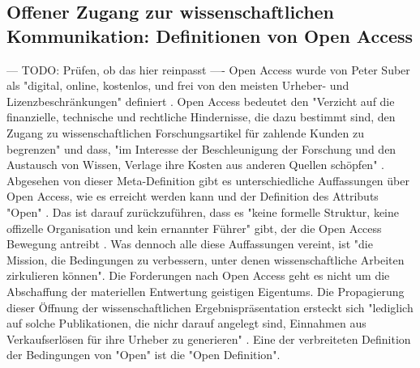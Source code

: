 \subsection{Offener Zugang zur wissenschaftlichen Kommunikation: Definitionen von Open Access}
--- TODO: Prüfen, ob das hier reinpasst ----
Open Access wurde von Peter Suber als "digital, online, kostenlos, und frei von den meisten Urheber- und Lizenzbeschränkungen" \cite{suber_2012_open} definiert \cite{Adema_2014_open_access}. Open Access bedeutet den "Verzicht auf die finanzielle, technische und rechtliche Hindernisse, die dazu bestimmt sind, den Zugang zu wissenschaftlichen Forschungsartikel für zahlende Kunden zu begrenzen" und dass, "im Interesse der Beschleunigung der Forschung und den Austausch von Wissen, Verlage ihre Kosten aus anderen Quellen schöpfen" \cite{Suber_2002}. Abgesehen von dieser Meta-Definition gibt es unterschiedliche Auffassungen über Open Access, wie es erreicht werden kann und der Definition des Attributs "Open" \cite{Adema_2014_open_access}. Das ist darauf zurückzuführen, dass es "keine formelle Struktur, keine offizelle Organisation und kein ernannter Führer" gibt, der die Open Access Bewegung antreibt \cite{poynder_2011_suber}. Was dennoch alle diese Auffassungen vereint, ist "die Mission, die Bedingungen zu verbessern, unter denen wissenschaftliche Arbeiten zirkulieren können"\cite{Adema_2014_open_access}. Die Forderungen nach Open Access geht es nicht um die Abschaffung der materiellen Entwertung geistigen Eigentums. Die Propagierung dieser Öffnung der wissenschaftlichen Ergebnispräsentation ersteckt sich "lediglich auf solche Publikationen, die nichr darauf angelegt sind, Einnahmen aus Verkaufserlösen für ihre Urheber zu generieren" \cite{muller_2010_open}. Eine der verbreiteten Definition der Bedingungen von "Open" ist die "Open Definition".

